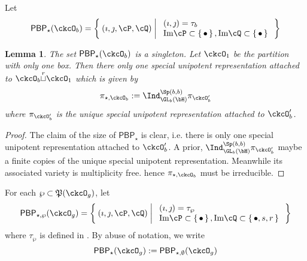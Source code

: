 \documentclass[12pt,a4paper]{amsart}
\def\Im{\operatorname{Im}}
\numberwithin{equation}{section}
\newtheorem{lem}[thm]{Lemma}
\theoremstyle{remark}
\def\Im{\mathrm{Im}}
\def\cuprow{{\stackrel{r}{\sqcup}}}
\def\CPP{\mathfrak{P}}
\def\PBP{\mathsf{PBP}}
\begin{document}
Let
\[
  \PBP_{\star}(\ckcO_{b}) = \Set{(\imath,\jmath, \cP,\cQ) | %
    \begin{array}{l}
      (\imath,\jmath) = \tau_{b}\\
      \Im \cP \subset \set{\bullet}, \Im \cQ \subset\set{\bullet
      }\\
    \end{array}
  }
\]

\begin{lem}\label{lem:bp.C*}
  The set $\PBP_{\star}(\ckcO_{b})$ is a singleton.
  Let $\ckcO_{1}$ be the partition with only one box.
  Then  there only one special unipotent representation
  attached to $\ckcO_{b}\cuprow \ckcO_{1}$ which is given by
  \[
    \pi_{\star,\ckcO_{b}}:=
    \Ind_{\GL_{b}(\bH)}^{\Sp(b,b)}\pi_{\ckcO'_{b}}
  \]
  where $\pi_{\ckcO'_{b}}$ is the unique special unipotent representation
  attached
  to $\ckcO'_{b}$.
\end{lem}
\begin{proof}
  The claim of the size of $\PBP_{\star}$ is clear, i.e. there is only one
  special unipotent representation attached to $\ckcO'_{b}$. A prior,
  $\Ind_{\GL_{b}(\bH)}^{\Sp(b,b)}\pi_{\ckcO'_{b}}$ maybe a finite copies of the
  unique special unipotent representation. Meanwhile its associated variety is
  multiplicity free. hence $\pi_{\star,\ckcO_{b}}$ must be irreducible.
\end{proof}

For each $\wp\subset \CPP(\ckcO_{g})$, let
\[
  \PBP_{\star,\wp}(\ckcO_g)= \Set{(\imath,\jmath,\cP,\cQ)| %
    \begin{array}{l}
      (\imath,\jmath) = \tau_{\wp}\\
      \Im \cP \subset \set{\bullet}, \Im \cQ \subset\set{\bullet, s,r}\\
    \end{array}
  }
\]
where $\tau_{\wp}$ is defined in .
By abuse of notation, we write
\[
\PBP_{\star}(\ckcO_g) :=\PBP_{\star,\emptyset}(\ckcO_g)
\]
\end{document}
